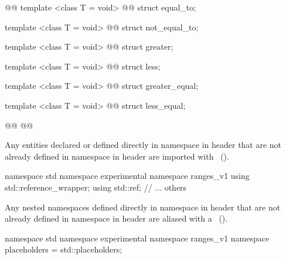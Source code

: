 \begin{codeblock}
@@
  template <class T = void>
    @@
  struct equal_to;
  
  template <class T = void>
    @@
  struct not_equal_to;
  
  template <class T = void>
    @@
  struct greater;
  
  template <class T = void>
    @@
  struct less;
  
  template <class T = void>
    @@
  struct greater_equal;
  
  template <class T = void>
    @@
  struct less_equal;
  
  @@
@\newtxt{\}\}\}}@
\end{codeblock}

{\color{newclr}
\pnum
Any entities declared or defined directly in namespace  in header 
that are not already defined in namespace  in header
 are imported with
~(). \enterexample
\begin{codeblock}
namespace std { namespace experimental { namespace ranges_v1 {
  using std::reference_wrapper;
  using std::ref;
  // ... others
}}}
\end{codeblock}
\exitexample

\pnum
Any nested namespaces defined directly in namespace  in header 
that are not already defined in namespace  in header
 are aliased with a
~(). \enterexample
\begin{codeblock}
namespace std { namespace experimental { namespace ranges_v1 {
  namespace placeholders = std::placeholders;
}}}
\end{codeblock}
\exitexample
}

